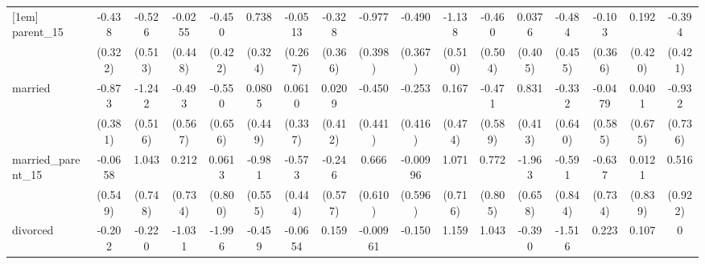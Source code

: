 {\begin{tabular}{l*{16}{c}}
[1em]
parent\_15           &      -0.438         &      -0.526         &     -0.0255         &      -0.450         &       0.738\sym{*}  &     -0.0513         &      -0.328         &      -0.977\sym{*}  &      -0.490         &      -1.138\sym{*}  &      -0.460         &      0.0376         &      -0.484         &      -0.103         &       0.192         &      -0.394         \\
                    &     (0.322)         &     (0.513)         &     (0.448)         &     (0.422)         &     (0.324)         &     (0.267)         &     (0.366)         &     (0.398)         &     (0.367)         &     (0.510)         &     (0.504)         &     (0.405)         &     (0.455)         &     (0.366)         &     (0.420)         &     (0.421)         \\
[1em]
married             &      -0.873\sym{*}  &      -1.242\sym{*}  &      -0.493         &      -0.550         &      0.0805         &      0.0610         &      0.0209         &      -0.450         &      -0.253         &       0.167         &      -0.471         &       0.831\sym{*}  &      -0.332         &     -0.0479         &      0.0401         &      -0.932         \\
                    &     (0.381)         &     (0.516)         &     (0.567)         &     (0.656)         &     (0.449)         &     (0.337)         &     (0.412)         &     (0.441)         &     (0.416)         &     (0.474)         &     (0.589)         &     (0.413)         &     (0.640)         &     (0.585)         &     (0.675)         &     (0.736)         \\
[1em]
married\_parent\_15   &     -0.0658         &       1.043         &       0.212         &      0.0613         &      -0.981         &      -0.573         &      -0.246         &       0.666         &    -0.00996         &       1.071         &       0.772         &      -1.963\sym{**} &      -0.591         &      -0.637         &      0.0121         &       0.516         \\
                    &     (0.549)         &     (0.748)         &     (0.734)         &     (0.800)         &     (0.555)         &     (0.444)         &     (0.577)         &     (0.610)         &     (0.596)         &     (0.716)         &     (0.805)         &     (0.658)         &     (0.844)         &     (0.734)         &     (0.839)         &     (0.922)         \\
[1em]
divorced            &      -0.202         &      -0.220         &      -1.031         &      -1.996         &      -0.459         &     -0.0654         &       0.159         &    -0.00961         &      -0.150         &       1.159         &       1.043         &      -0.390         &      -1.516         &       0.223         &       0.107         &           0         \\

\end{tabular}}
